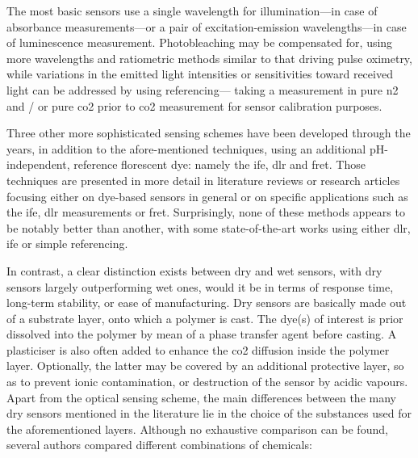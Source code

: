 The most basic sensors use a single wavelength for illumination---in case of absorbance measurements---or a pair of excitation-emission wavelengths---in case of luminescence measurement. Photobleaching may be compensated for, using more wavelengths and ratiometric methods similar to that driving pulse oximetry\cite{vurek1983, uttamlal1995, degrandpre1999, ge2003, lu2008, hakonen2008, ge2014, wang2020}, while variations in the emitted light intensities or sensitivities toward received light can be addressed by using referencing---\ie{} taking a measurement in pure \gls{n2} and / or pure \gls{co2} prior to \gls{co2} measurement for sensor calibration purposes\cite{opitz1984, zhujun1984b, wolfbeis1988, he1995, marazuela1995, mills1997, malins1998, wolfbeis1998, segawa2003, oter2006, fernandezsanchez2007, oter2008, chu2008, chu2009, dansby2010, chu2017, perez2017}.

Three other more sophisticated sensing schemes have been developed through the years, in addition to the afore-mentioned techniques, using an additional pH-independent, reference florescent dye: namely the \gls{ife}, \gls{dlr} and \gls{fret}. Those techniques are presented in more detail in literature reviews or research articles focusing either on dye-based sensors in general\cite{mills2009, clarke2017} or on specific applications such as the \gls{ife}\cite{nakamura2003, amao2004, amao2005a, amao2005b, perez2009, aguayolopez2014, fernandezramos2018, fernandezramos2019}, \gls{dlr} measurements\cite{klimant2001_pap, bultzingslowen2002, burke2006, cajlakovic2006, fritzsche2017, staudinger2018, pfeifer2020} or \gls{fret}\cite{lakowicz1993, neurauter1999, valeur2001_chap9, bultzingslowen2003}. Surprisingly, none of these methods appears to be notably better than another, with some state-of-the-art works using either \gls{dlr}\cite{pfeifer2020}, \gls{ife}\cite{fernandezramos2018} or simple referencing\cite{chu2017}.

In contrast, a clear distinction exists between dry and wet sensors, with dry sensors largely outperforming wet ones, would it be in terms of response time, long-term stability, or ease of manufacturing\cite{wolfbeis2005, mills2009}. Dry sensors are basically made out of a substrate layer, onto which a polymer is cast. The dye(s) of interest is prior dissolved into the polymer by mean of a phase transfer agent before casting. A plasticiser is also often added to enhance the \gls{co2} diffusion inside the polymer layer. Optionally, the latter may be covered by an additional protective layer, so as to prevent ionic contamination, or destruction of the sensor by acidic vapours. Apart from the optical sensing scheme, the main differences between the many dry sensors mentioned in the literature lie in the choice of the substances used for the aforementioned layers. Although no exhaustive comparison can be found, several authors compared different combinations of chemicals:

